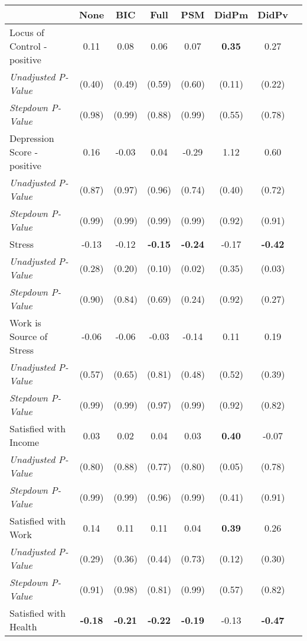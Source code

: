 \begin{tabular}{l c c c c c c c}
\toprule
 & None & BIC & Full & PSM & DidPm & DidPv \\
\midrule
Locus of Control - positive & 0.11 & 0.08 & 0.06 & 0.07 & \textbf{ 0.35 } & 0.27 \\
\quad \textit{Unadjusted P-Value} & (0.40) & (0.49) & (0.59) & (0.60) & (0.11) & (0.22) \\
\quad \textit{Stepdown P-Value} & (0.98) & (0.99) & (0.88) & (0.99) & (0.55) & (0.78) \\
Depression Score - positive & 0.16 & -0.03 & 0.04 & -0.29 & 1.12 & 0.60 \\
\quad \textit{Unadjusted P-Value} & (0.87) & (0.97) & (0.96) & (0.74) & (0.40) & (0.72) \\
\quad \textit{Stepdown P-Value} & (0.99) & (0.99) & (0.99) & (0.99) & (0.92) & (0.91) \\
Stress & -0.13 & -0.12 & \textbf{ -0.15 } & \textbf{ -0.24 } & -0.17 & \textbf{ -0.42 } \\
\quad \textit{Unadjusted P-Value} & (0.28) & (0.20) & (0.10) & (0.02) & (0.35) & (0.03) \\
\quad \textit{Stepdown P-Value} & (0.90) & (0.84) & (0.69) & (0.24) & (0.92) & (0.27) \\
Work is Source of Stress & -0.06 & -0.06 & -0.03 & -0.14 & 0.11 & 0.19 \\
\quad \textit{Unadjusted P-Value} & (0.57) & (0.65) & (0.81) & (0.48) & (0.52) & (0.39) \\
\quad \textit{Stepdown P-Value} & (0.99) & (0.99) & (0.97) & (0.99) & (0.92) & (0.82) \\
Satisfied with Income & 0.03 & 0.02 & 0.04 & 0.03 & \textbf{ 0.40 } & -0.07 \\
\quad \textit{Unadjusted P-Value} & (0.80) & (0.88) & (0.77) & (0.80) & (0.05) & (0.78) \\
\quad \textit{Stepdown P-Value} & (0.99) & (0.99) & (0.96) & (0.99) & (0.41) & (0.91) \\
Satisfied with Work & 0.14 & 0.11 & 0.11 & 0.04 & \textbf{ 0.39 } & 0.26 \\
\quad \textit{Unadjusted P-Value} & (0.29) & (0.36) & (0.44) & (0.73) & (0.12) & (0.30) \\
\quad \textit{Stepdown P-Value} & (0.91) & (0.98) & (0.81) & (0.99) & (0.57) & (0.82) \\
Satisfied with Health & \textbf{ -0.18 } & \textbf{ -0.21 } & \textbf{ -0.22 } & \textbf{ -0.19 } & -0.13 & \textbf{ -0.47 } \\

\end{tabular}
